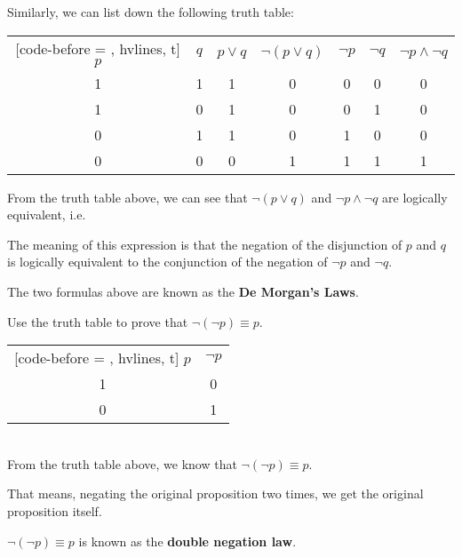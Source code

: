 \documentclass{report}
\newcounter{example}
\begin{document}
Similarly, we can list down the following truth table:
\begin{center}
    \begin{NiceTabular}{|c|c|c|c|c|c|c|}[code-before = , hvlines, t]
        $p$ & $q$ & $p \lor q$ & $\neg(p \lor q)$ & $\neg p$ & $\neg q$ & $\neg p \land \neg q$ \\
        1   & 1   & 1          & 0                & 0        & 0        & 0                     \\
        1   & 0   & 1          & 0                & 0        & 1        & 0                     \\
        0   & 1   & 1          & 0                & 1        & 0        & 0                     \\
        0   & 0   & 0          & 1                & 1        & 1        & 1                     \\
    \end{NiceTabular}
\end{center}

From the truth table above, we can see that $\neg (p \lor q)$ and $\neg p \land
    \neg q$ are logically equivalent, i.e.

\begin{center}
\end{center}

The meaning of this expression is that the negation of the disjunction of $p$
and $q$ is logically equivalent to the conjunction of the negation of $\neg p$
and $\neg q$.

The two formulas above are known as the \textbf{De Morgan's Laws}.
\vspace{0.5cm}
\begin{example}
    \item Use the truth table to prove that $\neg (\neg p) \equiv p$.
\end{example}
\begin{solution}
    \item
    \begin{NiceTabular}{|c|c|}[code-before = , hvlines, t]
        $p$ & $\neg p$ \\
        1   & 0        \\
        0   & 1        \\
    \end{NiceTabular}\\

    From the truth table above, we know that $\neg (\neg p) \equiv p$.

    That means, negating the original proposition two times, we get the original
    proposition itself.

    $\neg (\neg p) \equiv p$ is known as the \textbf{double negation law}.
\end{solution}
\end{document}
